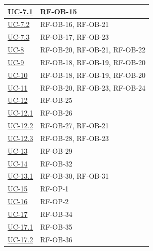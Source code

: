 \documentclass[a4paper,12pt]{article}
\begin{document}
\begin{center}
\begin{longtable}{|>{\centering\arraybackslash}p{5cm}|>{\centering\arraybackslash}p{9cm}|}
\hyperref[subsec:UC-7.1]{UC-7.1} & RF-OB-15 \\
\hline

\hyperref[subsec:UC-7.2]{UC-7.2} & RF-OB-16, RF-OB-21 \\
\hline

\hyperref[subsec:UC-7.3]{UC-7.3} & RF-OB-17, RF-OB-23 \\
\hline

\hyperref[subsec:UC-8]{UC-8} & RF-OB-20, RF-OB-21, RF-OB-22 \\
\hline

\hyperref[subsec:UC-9]{UC-9} & RF-OB-18, RF-OB-19, RF-OB-20 \\
\hline

\hyperref[subsec:UC-10]{UC-10} & RF-OB-18, RF-OB-19, RF-OB-20 \\
\hline

\hyperref[subsec:UC-11]{UC-11} & RF-OB-20, RF-OB-23, RF-OB-24 \\
\hline

\hyperref[subsec:UC-12]{UC-12} & RF-OB-25 \\
\hline

\hyperref[subsec:UC-12.1]{UC-12.1} & RF-OB-26 \\
\hline

\hyperref[subsec:UC-12.2]{UC-12.2} & RF-OB-27, RF-OB-21 \\
\hline

\hyperref[subsec:UC-12.3]{UC-12.3} & RF-OB-28, RF-OB-23 \\
\hline

\hyperref[subsec:UC-13]{UC-13} & RF-OB-29 \\
\hline

\hyperref[subsec:UC-14]{UC-14} & RF-OB-32 \\
\hline

\hyperref[subsec:UC-13.1]{UC-13.1} & RF-OB-30, RF-OB-31 \\
\hline

\hyperref[sec:UC-15]{UC-15} & RF-OP-1 \\
\hline

\hyperref[sec:UC-16]{UC-16} & RF-OP-2 \\
\hline

\hyperref[sec:UC-17]{UC-17} & RF-OB-34 \\
\hline

\hyperref[sec:UC-17.1]{UC-17.1} & RF-OB-35 \\
\hline

\hyperref[sec:UC-17.2]{UC-17.2} & RF-OB-36 \\
\hline


\end{longtable}
\end{center}
\end{document}

